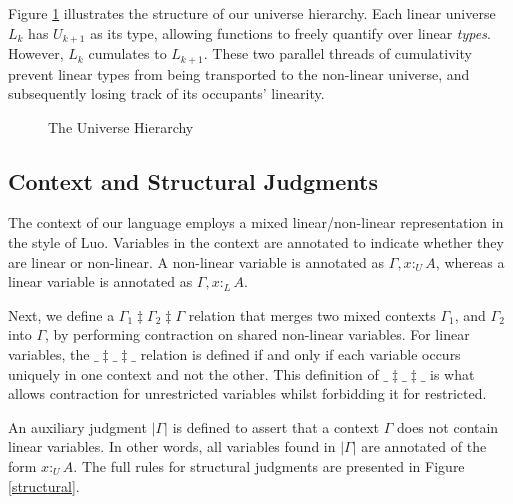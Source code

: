 \documentclass{article}
\theoremstyle{definition}
\newcommand{\pure}[1]{|#1|}
\newcommand{\utype}{:_{\scriptscriptstyle U}}
\newcommand{\ltype}{:_{\scriptscriptstyle L}}
\newcommand{\mrg}[3]{#1\ddagger#2\ddagger#3}
\begin{document}
  Figure \ref{universe} illustrates the structure of our universe hierarchy. Each linear universe $L_k$ has $U_{k+1}$ as its type, allowing functions to freely quantify over linear \textit{types}. However, $L_k$ cumulates to $L_{k+1}$. These two parallel threads of cumulativity prevent linear types from being transported to the non-linear universe, and subsequently losing track of its occupants' linearity.

  \begin{figure}[H]
    \caption{The Universe Hierarchy}
    \centering
    \label{universe}
  \end{figure}

  \subsection{Context and Structural Judgments}
  The context of our language employs a mixed linear/non-linear representation in the style of Luo\cite{luo}. Variables in the context are annotated to indicate whether they are linear or non-linear. A non-linear variable is annotated as $\Gamma, x \utype A$, whereas a linear variable is annotated as $\Gamma, x \ltype A$. 
  
  Next, we define a $\mrg{\Gamma_1}{\Gamma_2}{\Gamma}$ relation that merges two mixed contexts $\Gamma_1$, and $\Gamma_2$ into $\Gamma$, by performing contraction on shared non-linear variables. For linear variables, the $\mrg{\_}{\_}{\_}$ relation is defined if and only if each variable occurs uniquely in one context and not the other. This definition of $\mrg{\_}{\_}{\_}$ is what allows contraction for unrestricted variables whilst forbidding it for restricted.

  An auxiliary judgment $\pure{\Gamma}$ is defined to assert that a context $\Gamma$ does not contain linear variables. In other words, all variables found in $\pure{\Gamma}$ are annotated of the form $x \utype A$. The full rules for structural judgments are presented in Figure \ref{structural}.
  
\end{document}

